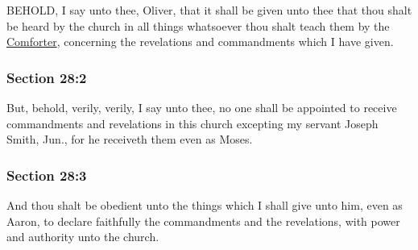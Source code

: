 		BEHOLD, I say unto thee, Oliver, that it shall be given unto thee that thou shalt be heard by the church in all things whatsoever thou shalt teach them by the \hyperref[COMFORTER]{Comforter}, concerning the revelations and commandments which I have given.


	\subsubsection{Section 28:2} %
		\label{DC28-2}

		But, behold, verily, verily, I say unto thee, no one shall be appointed to receive commandments and revelations in this church excepting my servant Joseph Smith, Jun., for he receiveth them even as Moses.


	\subsubsection{Section 28:3} %
		\label{DC28-3}

		And thou shalt be obedient unto the things which I shall give unto him, even as Aaron, to declare faithfully the commandments and the revelations, with power and authority unto the church.


